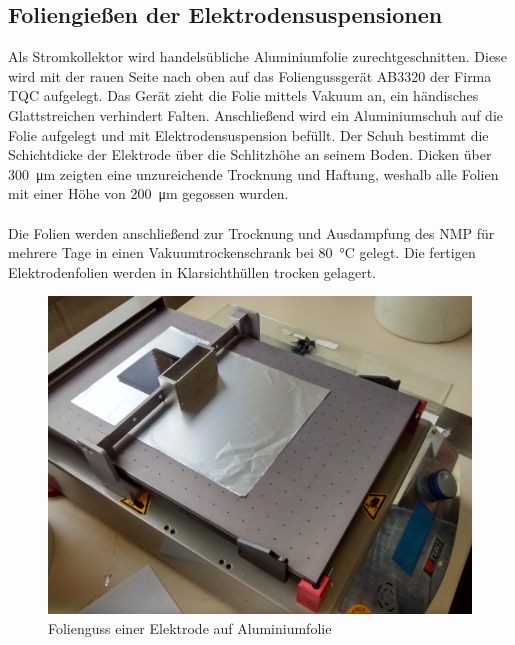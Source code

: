 \documentclass[a4paper, 11pt, headsepline,footsepline,twoside,abstract]{scrbook}
\begin{document}
\subsection{Foliengießen der Elektrodensuspensionen}
Als Stromkollektor wird handelsübliche Aluminiumfolie zurechtgeschnitten. Diese wird mit der rauen Seite nach oben auf das Foliengussgerät AB3320 der Firma TQC aufgelegt. Das Gerät zieht die Folie mittels Vakuum an, ein händisches Glattstreichen verhindert Falten. Anschließend wird ein Aluminiumschuh auf die Folie aufgelegt und mit Elektrodensuspension befüllt. Der Schuh bestimmt die Schichtdicke der Elektrode über die Schlitzhöhe an seinem Boden. Dicken über \SI{300}{\micro\metre} zeigten eine unzureichende Trocknung und Haftung, weshalb alle Folien mit einer Höhe von \SI{200}{\micro\metre} gegossen wurden.
\\\\
Die Folien werden anschließend zur Trocknung und Ausdampfung des NMP für mehrere Tage in einen Vakuumtrockenschrank bei \SI{80}{\celsius} gelegt. Die fertigen Elektrodenfolien werden in Klarsichthüllen trocken gelagert.
\begin{figure}
	\centering
	\includegraphics[width=0.9\columnwidth]{images/folienguss.jpg}
	\caption{Folienguss einer Elektrode auf Aluminiumfolie}
	\label{folienguss}
\end{figure}
\end{document}
